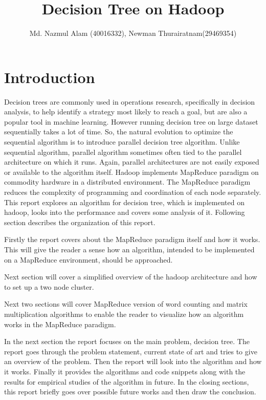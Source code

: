 \documentclass{article}
\title{Decision Tree on Hadoop}
\author{Md. Nazmul Alam (40016332), Newman Thurairatnam(29469354)}
\begin{document}
\maketitle
\newpage
\tableofcontents
\listofalgorithms
\lstlistoflistings
{}
\newpage
\section{Introduction}


Decision trees are commonly used in operations research, specifically in decision analysis, to help identify a strategy most likely to reach a goal, but are also a popular tool in machine learning\cite{wikidt}. However running decision tree on large dataset sequentially takes a lot of time. So, the natural evolution to optimize the sequential algorithm is to introduce parallel decision tree algorithm. Unlike sequential algorithm, parallel algorithm sometimes often tied to the parallel architecture on which it runs. Again, parallel architectures are not easily exposed or available to the algorithm itself. Hadoop implements MapReduce paradigm on commodity hardware in a distributed environment. The MapReduce paradigm reduces the complexity of programming and coordination of each node separately.
\BlankLine This report explores an algorithm for decision tree, which is implemented on hadoop, looks into the performance and covers some analysis of it. Following section describes the organization of this report.\BlankLine

Firstly the report covers about the MapReduce paradigm itself and how it works. This will give the reader a sense how an algorithm, intended to be implemented on a MapReduce environment, should be approached.

Next section will cover a simplified overview of the hadoop architecture and how to set up a two node cluster.

Next two sections will cover MapReduce version of word counting and matrix multiplication algorithms to enable the reader to visualize how an algorithm works in the MapReduce paradigm.

In the next section the report focuses on the main problem, decision tree. The report goes through the problem statement, current state of art and tries to give an overview of the problem. Then the report will look into the algorithm and how it works. Finally it provides the algorithms and code snippets along with the results for empirical studies of the algorithm in future.
In the closing sections, this report briefly goes over possible future works and then draw the conclusion.
\end{document}
